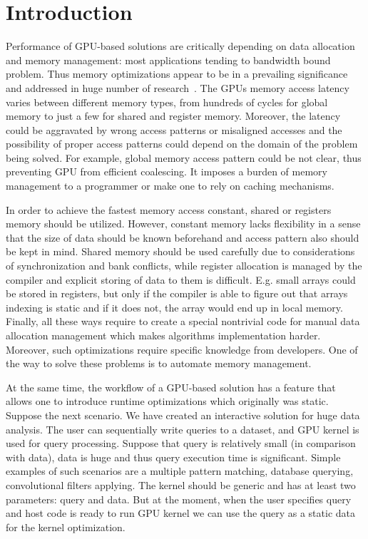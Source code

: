 \documentclass[sigplan,review,anonymous]{acmart}\settopmatter{printfolios=true,printccs=false,printacmref=false}
\begin{document}
\section{Introduction}

Performance of GPU-based solutions are critically depending on data allocation and memory management: most applications tending to bandwidth bound problem.
Thus memory optimizations appear to be in a prevailing significance and addressed in huge number of research~\cite{Sakdhnagool2019RegDemIG, Xie2018ICCADU, zhang2019efficient}.
The GPUs memory access latency varies between different memory types, from hundreds of cycles for global memory to just a few for shared and register memory.
Moreover, the latency could be aggravated by wrong access patterns or misaligned accesses and the possibility of proper access patterns could depend on the domain of the problem being solved.
For example, global memory access pattern could be not clear, thus preventing GPU from efficient coalescing. 
It imposes a burden of memory management to a programmer or make one to rely on caching mechanisms. 

In order to achieve the fastest memory access constant, shared or registers memory should be utilized.
However, constant memory lacks flexibility in a sense that the size of data should be known beforehand and access pattern also should be kept in mind.
Shared memory should be used carefully due to considerations of synchronization and bank conflicts, while register allocation is managed by the compiler and explicit storing of data to them is difficult.
E.g. small arrays could be stored in registers, but only if the compiler is able to figure out that arrays indexing is static and if it does not, the array would end up in local memory.
Finally, all these ways require to create a special nontrivial code for manual data allocation management which makes algorithms implementation harder.
Moreover, such optimizations require specific knowledge from developers.
One of the way to solve these problems is to automate memory management.

At the same time, the workflow of a GPU-based solution has a feature that allows one to introduce runtime optimizations which originally was static.
Suppose the next scenario.
We have created an interactive solution for huge data analysis.
The user can sequentially write queries to a dataset, and GPU kernel is used for query processing.
Suppose that query is relatively small (in comparison with data), data is huge and thus query execution time is significant.
Simple examples of such scenarios are a multiple pattern matching, database querying, convolutional filters applying.
The kernel should be generic and has at least two parameters: query and data.
But at the moment, when the user specifies query and host code is ready to run GPU kernel we can use the query as a static data for the kernel optimization.
\end{document}
